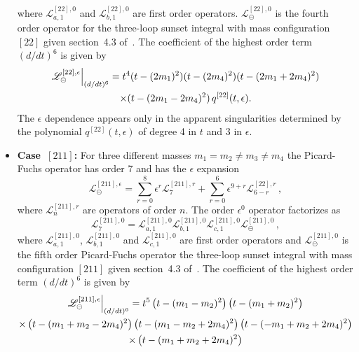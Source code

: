 \documentclass[a4paper,12pt]{article}
\numberwithin{equation}{section}
\numberwithin{figure}{section}
\def\su{\circleddash}
\begin{document}
\begin{itemize}
       where  $ \mathscr{L}^{[22],0}_{a,1}$ and $
       \mathscr{L}^{[22],0}_{b,1}$ are first order operators. 
        $\mathscr{L}^{[22],0}_\su$ is the fourth order operator for the
       three-loop sunset integral with mass configuration $[22]$ given  section~4.3 of~\cite{Lairez:2022zkj}.
    The coefficient of the highest order term $(d/dt)^6$    is given by
       \begin{multline}
                   \mathscr{L}^{[22],\epsilon}_\su\Big\vert_{(d/dt)^6}=
                   t^4(t-(2m_1)^2)(t-(2m_4)^2)(t-(2m_1+2m_4)^2)\cr\times(t-(2m_1-2m_4)^2)
                   \, q^{[22]}(t,\epsilon).
                 \end{multline}
                 The $\epsilon$ dependence appears only in the
                 apparent singularities determined by the polynomial
                 $q^{[22]}(t,\epsilon)$ of degree 4 in $t$ and $3$ in $\epsilon$.
     \item   {\bf Case~$[211]$:} For three different masses $m_1=m_2\neq m_3 \neq m_4$ the
  Picard-Fuchs operator has order 7 and has the $\epsilon$ expansion
  \begin{equation}
    \mathscr{L}^{[211],\epsilon}_\su=       \sum_{r=0}^8 \epsilon^r
    \mathscr{L}^{[211],r}_{7}+  \sum_{r=0}^6 \epsilon^{9+r}   \mathscr{L}^{[22],r}_{6-r} \,,
  \end{equation}
   where  $ \mathscr{L}^{[211],r}_{n}$ 
  are operators of order $n$.
    The order $\epsilon^0$ operator factorizes as
  \begin{equation}
         \mathscr{L}^{[211],0}_{7}=   \mathscr{L}^{[211],0}_{a,1}  \mathscr{L}^{[211],0}_{b,1} \mathscr{L}^{[211],0}_{c,1}\mathscr{L}^{[211],0}_\su \,,
       \end{equation}
        where  $ \mathscr{L}^{[211],0}_{a,1}$,  $
        \mathscr{L}^{[211],0}_{b,1}$ and  $ \mathscr{L}^{[211],0}_{c,1}$ are  first order operators
       and $\mathscr{L}^{[211],0}_\su$ is the fifth order Picard-Fuchs operator the
       three-loop sunset integral with mass configuration $[211]$
       given section~4.3 of~\cite{Lairez:2022zkj}.   The coefficient of the highest order term $(d/dt)^6$    is given by
       \begin{multline}
                   \mathscr{L}^{[211],\epsilon}_\su\Big\vert_{(d/dt)^6}=
                   t^5\left(t-(m_{1}-m_{2})^2\right) \left(t-(m_{1}+m_{2})^2\right)\cr\times
   \left(t-(m_{1}+m_{2}-2 m_{4})^2\right) \left(t-(m_{1}-m_{2}+2
   m_{4})^2\right) \left(t-(-m_{1}+m_{2}+2 m_{4})^2\right)\cr\times
   \left(t-(m_{1}+m_{2}+2 m_{4})^2\right)

\end{multline}
\end{itemize}
\end{document}

